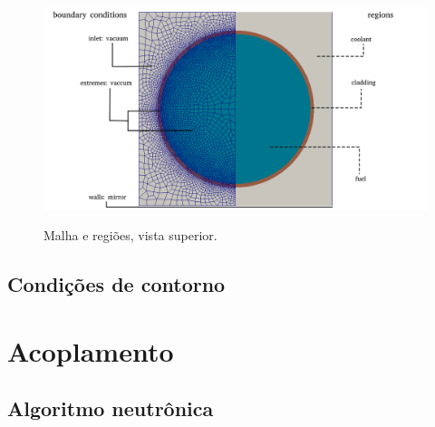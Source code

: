 \begin{figure}[htb]
  \caption{Malha e regiões, vista superior.}
  \centering\includegraphics[scale=0.5]{figuras/regions_neutronica_malha_e_sem.png}
  \label{regions_malha}
\end{figure}

\subsection{Condições de contorno}


\section{Acoplamento} %

\subsection{Algoritmo neutrônica}

